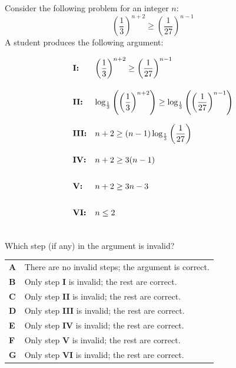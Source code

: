 \documentclass[11pt,a4paper]{article}
\begin{document}
\begin{enumerate}[label=\textbf{\arabic*.},leftmargin=*,itemsep=0pt,start=8]
Consider the following problem for an integer $n$: \[ \left( \dfrac{1}{3} \right)^{n+2} \ge \left( \dfrac{1}{27} \right)^{n-1} \] A student produces the following argument:

\[ \begin{array}{@{}l l@{}}
\textbf{I:} & \text{$\left( \dfrac{1}{3} \right)^{n+2} \ge \left( \dfrac{1}{27} \right)^{n-1}$} \\[20pt]

\textbf{II:} & \text{$\log_{\frac{1}{3}} \left( \left( \dfrac{1}{3} \right)^{n+2} \right) \ge \log_{\frac{1}{3}} \left( \left( \dfrac{1}{27} \right)^{n-1} \right)$} \\[20pt]

\textbf{III:} & \text{$n+2 \ge (n-1)\log_{\frac{1}{3}} \left( \dfrac{1}{27} \right)$} \\[20pt]

\textbf{IV:} & \text{$n+2 \ge 3(n-1)$} \\[20pt]

\textbf{V:} & \text{$n+2 \ge 3n-3$} \\[20pt]

\textbf{VI:} & \text{$n \le 2$} \\[20pt]
\end{array} \] Which step (if any) in the argument is invalid?

\par\vspace*{12pt}
\begin{tabularx}{\linewidth}{@{}>{\bfseries}l Y@{}}
A &
There are no invalid steps; the argument is correct.
\\[0.8em]
B &
Only step \textbf{I} is invalid; the rest are correct.
\\[0.8em]
C &
Only step \textbf{II} is invalid; the rest are correct.
\\[0.8em]
D &
Only step \textbf{III} is invalid; the rest are correct.
\\[0.8em]
E &
Only step \textbf{IV} is invalid; the rest are correct.
\\[0.8em]
F &
Only step \textbf{V} is invalid; the rest are correct.
\\[0.8em]
G &
Only step \textbf{VI} is invalid; the rest are correct.
\\
\end{tabularx}
\end{enumerate}
\end{document}
